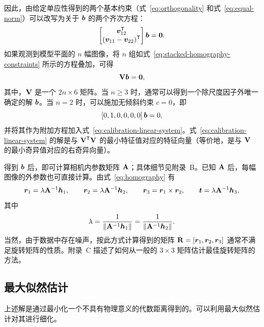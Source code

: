 因此，由给定单应性得到的两个基本约束（式~\eqref{eq:orthogonality} 和式~\eqref{eq:equal-norm}）可以改写为关于 $\boldsymbol{b}$ 的两个齐次方程：
\begin{equation}
\begin{bmatrix}
\boldsymbol{v}_{12}^{\mathsf{T}}\\
(\boldsymbol{v}_{11}-\boldsymbol{v}_{22})^{\mathsf{T}}
\end{bmatrix}\boldsymbol{b}=\boldsymbol{0} .
\label{eq:stacked-homography-constraints}
\end{equation}
如果观测到模型平面的 $n$ 幅图像，将 $n$ 组如式~\eqref{eq:stacked-homography-constraints} 所示的方程叠加，可得
\begin{equation}
\mathbf{V}\boldsymbol{b}=\boldsymbol{0},
\label{eq:calibration-linear-system}
\end{equation}
其中，$\mathbf{V}$ 是一个 $2n\times6$ 矩阵。当 $n\geq3$ 时，通常可以得到一个除尺度因子外唯一确定的解 $\boldsymbol{b}$。当 $n=2$ 时，可以施加无倾斜约束 $c=0$，即
\begin{equation*}
\left[0,1,0,0,0,0\right]\boldsymbol{b}=0,
\end{equation*}
并将其作为附加方程加入式~\eqref{eq:calibration-linear-system}。式~\eqref{eq:calibration-linear-system} 的解是与 $\mathbf{V}^{\mathsf{T}}\mathbf{V}$ 的最小特征值对应的特征向量（等价地，是与 $\mathbf{V}$ 的最小奇异值对应的右奇异向量）。

得到 $\boldsymbol{b}$ 后，即可计算相机内参数矩阵 $\mathbf{A}$；具体细节见附录~B。已知 $\mathbf{A}$ 后，每幅图像的外参数也可直接计算。由式~\eqref{eq:homography} 有
\begin{equation*}
\boldsymbol{r}_1=\lambda\mathbf{A}^{-1}\boldsymbol{h}_1,\qquad
\boldsymbol{r}_2=\lambda\mathbf{A}^{-1}\boldsymbol{h}_2,\qquad
\boldsymbol{r}_3=\boldsymbol{r}_1\times\boldsymbol{r}_2,\qquad
\boldsymbol{t}=\lambda\mathbf{A}^{-1}\boldsymbol{h}_3,
\end{equation*}
其中
\begin{equation*}
\lambda=\frac{1}{\left\lVert\mathbf{A}^{-1}\boldsymbol{h}_1\right\rVert}
=\frac{1}{\left\lVert\mathbf{A}^{-1}\boldsymbol{h}_2\right\rVert} .
\end{equation*}
当然，由于数据中存在噪声，按此方式计算得到的矩阵
 $\mathbf{R}=\left[\boldsymbol{r}_1,\boldsymbol{r}_2,\boldsymbol{r}_3\right]$
通常不满足旋转矩阵的性质。附录~C 描述了如何从一般的 $3\times3$ 矩阵估计最佳旋转矩阵的方法。

\subsection{最大似然估计}\label{subsec:maximum-likelihood}

上述解是通过最小化一个不具有物理意义的代数距离得到的。可以利用最大似然估计对其进行细化。

